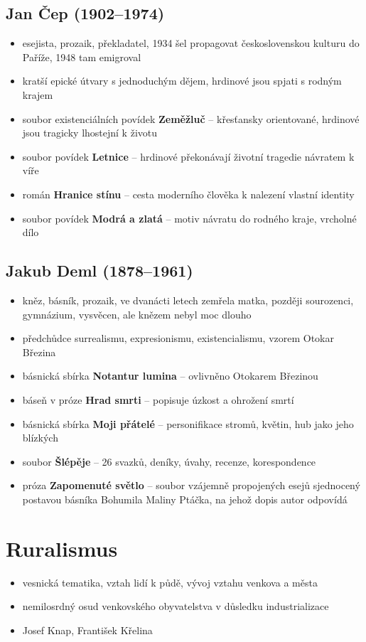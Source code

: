 \subsection{Jan Čep (1902--1974)}
\begin{itemize}
\item esejista, prozaik, překladatel, 1934 šel propagovat československou kulturu do Paříže, 1948 tam emigroval
\item kratší epické útvary s jednoduchým dějem, hrdinové jsou spjati s rodným krajem
\item soubor existenciálních povídek \textbf{Zeměžluč} -- křesťansky orientované, hrdinové jsou tragicky lhostejní k životu
\item soubor povídek \textbf{Letnice} -- hrdinové překonávají životní tragedie návratem k víře
\item román \textbf{Hranice stínu} -- cesta moderního člověka k nalezení vlastní identity 
\item soubor povídek \textbf{Modrá a zlatá} -- motiv návratu do rodného kraje, vrcholné dílo
\end{itemize}

\subsection{Jakub Deml (1878--1961)} 
\begin{itemize}
\item kněz, básník, prozaik, ve dvanácti letech zemřela matka, později sourozenci, gymnázium, vysvěcen, ale knězem nebyl moc dlouho
\item předchůdce surrealismu, expresionismu, existencialismu, vzorem Otokar Březina
\item básnická sbírka \textbf{Notantur lumina} -- ovlivněno Otokarem Březinou
\item báseň v próze \textbf{Hrad smrti} -- popisuje úzkost a ohrožení smrtí
\item básnická sbírka \textbf{Moji přátelé} -- personifikace stromů, květin, hub jako jeho blízkých
\item soubor \textbf{Šlépěje} -- 26 svazků, deníky, úvahy, recenze, korespondence
\item próza \textbf{Zapomenuté světlo} -- soubor vzájemně propojených esejů sjednocený postavou básníka Bohumila Maliny Ptáčka, na jehož dopis autor odpovídá
\end{itemize}

\section{Ruralismus}
\begin{itemize}
\item  vesnická tematika, vztah lidí k půdě, vývoj vztahu venkova a města
\item nemilosrdný osud venkovského obyvatelstva v důsledku industrializace
\item Josef Knap, František Křelina
\end{itemize}

